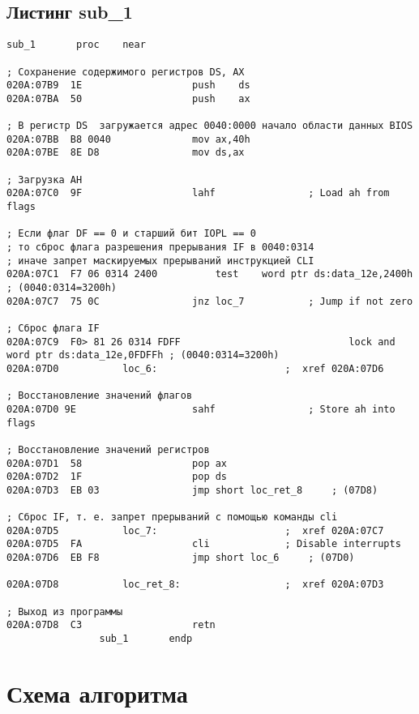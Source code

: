 \subsection*{Листинг sub\_1} 
\begin{lstlisting}[style={asm}]	
				sub_1		proc	near
				
; Сохранение содержимого регистров DS, AX
020A:07B9  1E					push	ds
020A:07BA  50					push	ax

; В регистр DS  загружается адрес 0040:0000 начало области данных BIOS
020A:07BB  B8 0040				mov	ax,40h
020A:07BE  8E D8				mov	ds,ax

; Загрузка AH
020A:07C0  9F					lahf				; Load ah from flags

; Если флаг DF == 0 и старший бит IOPL == 0
; то сброс флага разрешения прерывания IF в 0040:0314
; иначе запрет маскируемых прерываний инструкцией CLI
020A:07C1  F7 06 0314 2400			test	word ptr ds:data_12e,2400h	; (0040:0314=3200h)
020A:07C7  75 0C				jnz	loc_7			; Jump if not zero

; Сброс флага IF 
020A:07C9  F0> 81 26 0314 FDFF	                           lock	and	word ptr ds:data_12e,0FDFFh	; (0040:0314=3200h)
020A:07D0			loc_6:						;  xref 020A:07D6

; Восстановление значений флагов
020A:07D0 9E					sahf				; Store ah into flags

; Восстановление значений регистров
020A:07D1  58					pop	ax
020A:07D2  1F					pop	ds
020A:07D3  EB 03				jmp	short loc_ret_8		; (07D8)

; Сброс IF, т. е. запрет прерываний с помощью команды cli
020A:07D5			loc_7:						;  xref 020A:07C7
020A:07D5  FA					cli				; Disable interrupts
020A:07D6  EB F8				jmp	short loc_6		; (07D0)

020A:07D8			loc_ret_8:					;  xref 020A:07D3

; Выход из программы
020A:07D8  C3					retn
				sub_1		endp

\end{lstlisting}

\clearpage

\section*{Схема алгоритма}




